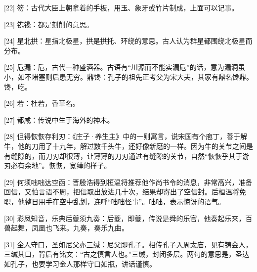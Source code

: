 \documentclass[12pt,UTF8]{ctexbook}
\begin{document}
[22] 笏：古代大臣上朝拿着的手板，用玉、象牙或竹片制成，上面可以记事。

[23] 镌镵：都是刻削的意思。

[24] 星北拱：星指北极星，拱是拱托、环绕的意思。古人认为群星都围绕北极星而分布。

[25] 卮漏：卮，古代一种盛酒器。古语有“川源而不能实漏卮”的话，意为漏洞虽小，如不堵塞则后患无穷。鼎馋：孔子的祖先正考父为宋大夫，其家有鼎名馋鼎。馋，吃。

[26] 若：杜若，香草名。

[27] 都咸：传说中生于海外的神木。

[28] 但得恢恢存利刃：《庄子·养生主》中的一则寓言，说宋国有个庖丁，善于解牛，他的刀用了十九年，解过数千头牛，还好像新磨的一样。因为牛的关节之间是有缝隙的，而刀刃却很薄，让薄薄的刀刃通过有缝隙的关节，自然“恢恢乎其于游刃必有余地”。恢恢，宽绰的样子。

[29] 何须咄咄达空函：晋殷浩得到桓温将推荐他作尚书令的消息，非常高兴，准备回信，又怕言语不周，把信取出放进几十次，结果却寄出了空信封。后桓温将免职，他整日用手在空中乱划，连呼“咄咄怪事”。咄咄，表示惊讶的语气。

[30] 彩凤知音，乐典后夔须九奏：后夔，即夔，传说是舜的乐官，他奏起乐来，百兽起舞，凤凰也飞来。九奏，奏乐九曲。

[31] 金人守口，圣如尼父亦三缄：尼父即孔子。相传孔子入周太庙，见有铸金人，三缄其口，背后有铭文：“古之慎言人也。”三缄，封闭多层。两句的意思是，圣达如孔子，也要学习金人那样守口如瓶，讲话谨慎。

\backmatter
\end{document}
